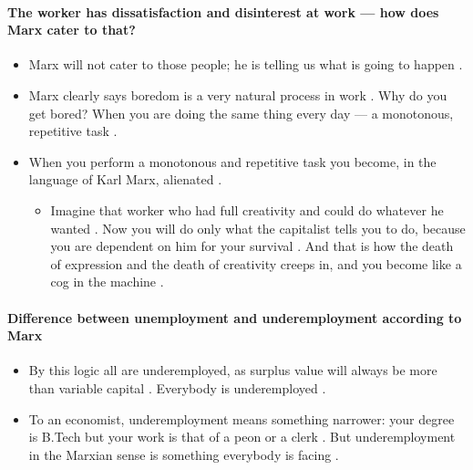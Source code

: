 \paragraph{The worker has dissatisfaction and disinterest at work --- how does Marx cater to that?}
\begin{itemize}
    \item Marx will not cater to those people; he is telling us what is going to happen .
    \item Marx clearly says boredom is a very natural process in work . Why do you get bored? When you are doing the same thing every day --- a monotonous, repetitive task .
    \item When you perform a monotonous and repetitive task you become, in the language of Karl Marx, alienated .
    \begin{itemize}
        \item Imagine that worker who had full creativity and could do whatever he wanted . Now you will do only what the capitalist tells you to do, because you are dependent on him for your survival . And that is how the death of expression and the death of creativity creeps in, and you become like a cog in the machine .
    \end{itemize}
\end{itemize}

\paragraph{Difference between unemployment and underemployment according to Marx}
\begin{itemize}
    \item By this logic all are underemployed, as surplus value will always be more than variable capital . Everybody is underemployed .
    \item To an economist, underemployment means something narrower: your degree is B.Tech but your work is that of a peon or a clerk . But underemployment in the Marxian sense is something everybody is facing .
\end{itemize}

